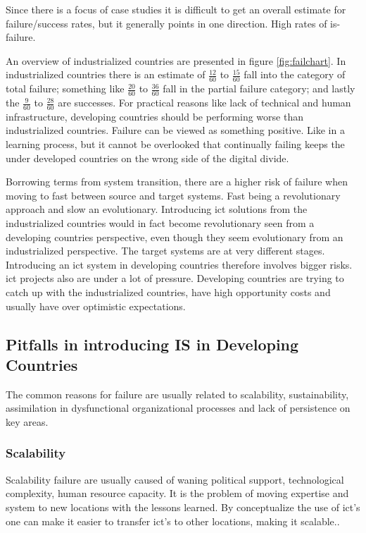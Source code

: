 Since there is a focus of case studies it is difficult to get an overall estimate for failure/success rates, but it generally points in one direction. High rates of \gls{is}-failure.


An overview of industrialized countries are presented in figure \ref{fig:failchart}.
In industrialized countries there is an estimate of $\frac{12}{60}$ to $\frac{15}{60}$ fall into the category of total failure; something like $\frac{20}{60}$ to $\frac{36}{60}$ fall in the partial failure category; and lastly the $\frac{9}{60}$ to $\frac{28}{60}$ are successes.
For practical reasons like lack of technical and human infrastructure, developing countries should be performing worse than industrialized countries.
Failure can be viewed as something positive. 
Like in a learning process, but it cannot be overlooked that continually failing keeps the under developed countries on the wrong side of the digital divide. 

Borrowing terms from system transition, there are a higher risk of failure when moving to fast between source and target systems.
Fast being a revolutionary approach and slow an evolutionary.
Introducing \gls{ict} solutions from the industrialized countries would in fact become revolutionary seen from a developing countries perspective, even though they seem evolutionary from an industrialized perspective. 
The target systems are at very different stages.
Introducing an \gls{ict} system in developing countries therefore involves bigger risks.
\gls{ict} projects also are under a lot of pressure. Developing countries are trying to catch up with the industrialized countries, have high opportunity costs and usually have over optimistic expectations.

\cite{rh:isdc}
\cite{ca:isdc}

\subsection{Pitfalls in introducing IS in Developing Countries}
The common reasons for failure are usually related to scalability, sustainability, assimilation in dysfunctional organizational processes and lack of persistence on key areas.
\subsubsection{Scalability}
Scalability failure are usually caused of waning political support, technological complexity, human resource capacity. It is the problem of moving expertise and system to new locations with the lessons learned. By conceptualize the use of \gls{ict}'s one can make it easier to transfer \gls{ict}'s to other locations, making it scalable.\cite{jbemss:noa}.
